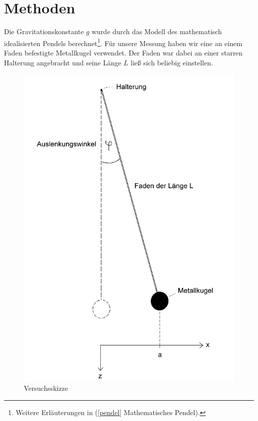\documentclass[11pt,a4paper,titlepage, ngerman]{article}
\begin{document}
	\section{Methoden}
		Die Gravitationskonstante $g$ wurde durch das Modell des mathematisch idealisierten Pendels berechnet\footnote{Weitere Erläuterungen in (\ref{pendel} Mathematisches Pendel).}.
		Für unsere Messung haben wir eine an einem Faden befestigte Metallkugel verwendet. Der Faden war dabei an einer starren Halterung angebracht und seine Länge $L$ ließ sich beliebig einstellen.
		
		\begin{figure}[ht]
			\centering
			\includegraphics[scale=0.4]{Pendel.png}		
			\caption{Versuchsskizze}
			\label{fig:pendel}
		\end{figure}
		
\end{document}
